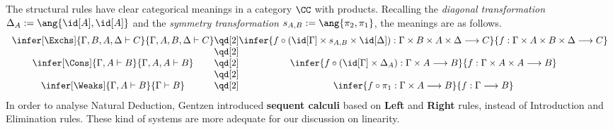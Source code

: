 \documentclass{svmult}
\begin{document}
The structural rules have clear categorical meanings in a category $\CC$ with products. Recalling the \emph{diagonal transformation}
$\Delta_A:=\ang{\id[A],\id[A]}$ and the \emph{symmetry transformation} $s_{A,B}:=\ang{\pi_2,\pi_1}$, the meanings are as follows.
\[\begin{array}{c@{\qd[2]}c}
\infer[\Exchs]{\Gamma , B, A, \Delta \vdash C}{\Gamma , A, B, \Delta  \vdash C} &
\infer{f \circ (\id[\Gamma]\times s_{A, B}\times\id[\Delta]):\Gamma\times B\times A\times\Delta\longrightarrow C}%
            {f:\Gamma\times A \times B \times \Delta \longrightarrow C} \\\\
\infer[\Cons]{\Gamma , A \vdash B}{\Gamma , A, A \vdash B}
& \infer{f\circ(\id[\Gamma]\times\Delta_{A}) : \Gamma \times A \longrightarrow B}{f : \Gamma \times A \times A \longrightarrow B} \\\\
\infer[\Weaks]{\Gamma , A \vdash B}{\Gamma \vdash B} & \infer{f\circ\pi_1:\Gamma \times A \longrightarrow B}{f : \Gamma \longrightarrow B}
\end{array}\]
%
In order to analyse Natural Deduction, Gentzen introduced \textbf{sequent calculi} based on \textbf{Left} and \textbf{Right} rules, instead of Introduction and Elimination rules. These kind of systems are more adequate for our discussion on linearity.
\end{document}
